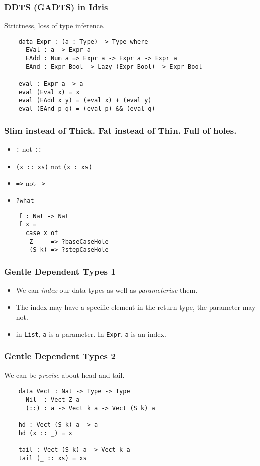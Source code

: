 \documentclass[hyperref={colorlinks = true,linkcolor = blue, citecolor = blue, urlcolor = blue}]{beamer}
\begin{document}
\begin{frame}[fragile]
  \frametitle{DDTS (GADTS) in Idris}
  Strictness, loss of type inference.
  \begin{verbatim}
    data Expr : (a : Type) -> Type where
      EVal : a -> Expr a
      EAdd : Num a => Expr a -> Expr a -> Expr a
      EAnd : Expr Bool -> Lazy (Expr Bool) -> Expr Bool

    eval : Expr a -> a
    eval (Eval x) = x
    eval (EAdd x y) = (eval x) + (eval y)
    eval (EAnd p q) = (eval p) && (eval q)
  \end{verbatim}
\end{frame}

\begin{frame}[fragile]
  \frametitle{Slim instead of Thick. Fat instead of Thin. Full of holes.}
  \begin{itemize}
    \item \texttt{:} not \texttt{::}
    \item \texttt{(x :: xs)} not \texttt{(x : xs)}
    \item \texttt{=>} not \texttt{->}
    \item \texttt{?what}
  \end{itemize}
  \begin{verbatim}
    f : Nat -> Nat
    f x =
      case x of
       Z     => ?baseCaseHole
       (S k) => ?stepCaseHole
  \end{verbatim}
\end{frame}

\begin{frame}[fragile]
  \frametitle{Gentle Dependent Types 1}
  \begin{itemize}
    \item We can \emph{index} our data types as well as \emph{parameterise} them.
    \item The index may have a specific element in the return type, the parameter may not.
    \item in \texttt{List}, \texttt{a} is a parameter. In 
             \texttt{Expr}, \texttt{a} is an index.
  \end{itemize}
\end{frame}

\begin{frame}[fragile]
  \frametitle{Gentle Dependent Types 2}
  We can be \emph{precise} about head and tail.
  \begin{verbatim}
    data Vect : Nat -> Type -> Type
      Nil  : Vect Z a
      (::) : a -> Vect k a -> Vect (S k) a

    hd : Vect (S k) a -> a      
    hd (x :: _) = x      
      
    tail : Vect (S k) a -> Vect k a      
    tail (_ :: xs) = xs    
  \end{verbatim}
\end{frame}
\end{document}
